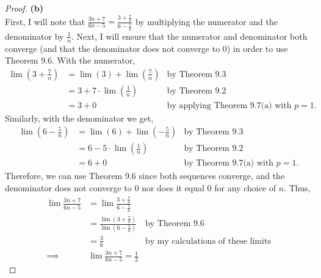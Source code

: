 \documentclass[10pt,a4paper]{article}
\theoremstyle{definition}
\begin{document}
\begin{proof}{\textbf{(b)}}
\\First, I will note that $\displaystyle \frac{3n + 7}{6n - 5} = \frac{3 + \frac{7}{n}}{6 - \frac{5}{n}}$ by multiplying the numerator and the denominator by $\frac{1}{n}$. Next, I will ensure that the numerator and denominator both converge (and that the denominator does not converge to 0) in order to use Theorem 9.6. With the numerator,
\begin{align*}
\lim\left(3 + \frac{7}{n}\right) &= \lim(3) + \lim\left(\frac{7}{n}\right) &\text{by Theorem 9.3}\\
&= 3 + 7\cdot \lim\left(\frac{1}{n}\right) &\text{by Theorem 9.2}\\
&= 3 + 0&\text{by applying Theorem 9.7(a) with } p = 1.
\end{align*}
Similarly, with the denominator we get,
\begin{align*}
\lim\left(6 - \frac{5}{n}\right) &= \lim(6) + \lim\left(-\frac{5}{n}\right) &\text{by Theorem 9.3}\\
&= 6 -5 \cdot \lim\left(\frac{1}{n}\right) &\text{by Theorem 9.2}\\
&= 6 + 0&\text{by Theorem 9.7(a) with } p = 1.
\end{align*}
Therefore, we can use Theorem 9.6 since both sequences converge, and the denominator does not converge to 0 nor does it equal 0 for any choice of $n$. Thus, 
\begin{align*}
\lim \frac{3n + 7}{6n - 5} &= \lim \frac{3 + \frac{7}{n}}{6 - \frac{5}{n}}\\
&= \frac{\lim\left(3 + \frac{7}{n}\right)}{\lim\left(6 - \frac{5}{n}\right)} &\text{by Theorem 9.6}\\
&= \frac{3}{6} &\text{by my calculations of these limits}\\
\implies &\boxed{\lim \frac{3n + 7}{6n - 5} = \frac{1}{2}}
\end{align*}
\end{proof}
\end{document}
